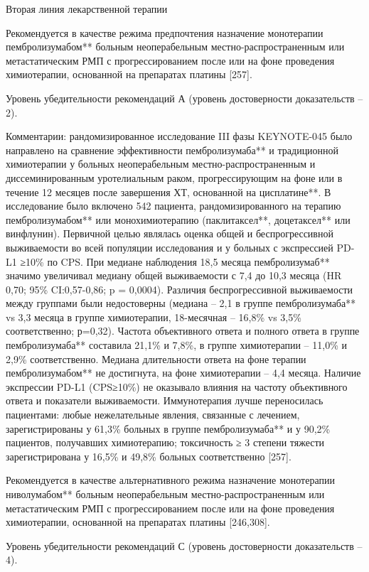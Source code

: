 Вторая линия лекарственной терапии

Рекомендуется в качестве режима предпочтения назначение монотерапии пембролизумабом** больным неоперабельным местно-распространенным или метастатическим РМП с прогрессированием после или на фоне проведения химиотерапии, основанной на препаратах платины [257].

Уровень убедительности рекомендаций А (уровень достоверности доказательств – 2).

Комментарии: рандомизированное исследование III фазы KEYNOTE-045 было направлено на сравнение эффективности пембролизумаба** и традиционной химиотерапии у больных неоперабельным местно-распространенным и диссеминированным уротелиальным раком, прогрессирующим на фоне или в течение 12 месяцев после завершения ХТ, основанной на цисплатине**. В исследование было включено 542 пациента, рандомизированного на терапию пембролизумабом** или монохимиотерапию (паклитаксел**, доцетаксел** или винфлунин). Первичной целью являлась оценка общей и беспрогрессивной выживаемости во всей популяции исследования и у больных с экспрессией PD-L1 ≥10\% по CPS. При медиане наблюдения 18,5 месяца пембролизумаб** значимо увеличивал медиану общей выживаемости с 7,4 до 10,3 месяца (HR 0,70; 95\% CI:0,57-0,86; p = 0,0004). Различия беспрогрессивной выживаемости между группами были недостоверны (медиана – 2,1 в группе пембролизумаба** vs 3,3 месяца в группе химиотерапии, 18-месячная – 16,8\% vs 3,5\% соответственно; р=0,32). Частота объективного ответа и полного ответа в группе пембролизумаба** составила 21,1\% и 7,8\%, в группе химиотерапии – 11,0\% и 2,9\% соответственно. Медиана длительности ответа на фоне терапии пембролизумабом** не достигнута, на фоне химиотерапии – 4,4 месяца. Наличие экспрессии PD-L1 (CPS≥10\%) не оказывало влияния на частоту объективного ответа и показатели выживаемости. Иммунотерапия лучше переносилась пациентами: любые нежелательные явления, связанные с лечением, зарегистрированы у 61,3\% больных в группе пембролизумаба** и у 90,2\% пациентов, получавших химиотерапию; токсичность ≥ 3 степени тяжести зарегистрирована у 16,5\% и 49,8\% больных соответственно [257].

Рекомендуется в качестве альтернативного режима назначение монотерапии ниволумабом** больным неоперабельным местно-распространенным или метастатическим РМП с прогрессированием после или на фоне проведения химиотерапии, основанной на препаратах платины [246,308].

Уровень убедительности рекомендаций С (уровень достоверности доказательств – 4).

